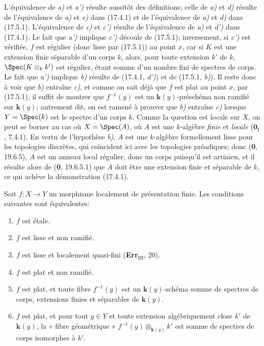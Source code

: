 L'équivalence de \emph{a)} et \emph{a')} résulte aussitôt des définitions; celle de \emph{a)} et \emph{d)} résulte de l'équivalence de \emph{a)} et \emph{e)} dans (17.4.1) et de l'équivalence de \emph{a)} et \emph{d)} dans (17.5.1). L'équivalence de \emph{c)} et \emph{c')} résulte de l'équivalence de \emph{a)} et \emph{d')} dans (17.4.1). Le fait que \emph{a')} implique \emph{c')} découle de (17.5.1); inversement, si \emph{c')} est vérifiée, $f$ est régulier (donc lisse par (17.5.1)) au point $x$, car si $K$ est une extension finie séparable d'un corps $k$, alors, pour toute extension $k'$ de $k$, $\Spec(K\otimes_k k')$ est régulier, étant somme d'un nombre fini de spectres de corps. Le fait que \emph{a')} implique \emph{b)} résulte de (17.4.1, \emph{d')}) et de (17.5.1, \emph{b)}). Il reste donc à voir que \emph{b)} entraîne \emph{c)}, et comme on sait déjà que $f$ est plat au point $x$, par (17.5.1), il suffit de montrer que $f^{-1}(y)$ est un $\boldsymbol{k}(y)$-préschéma non ramifié sur $\boldsymbol{k}(y)$; autrement dit, on est ramené à prouver que \emph{b)} entraîne \emph{c)} lorsque $Y=\Spec(k)$ est le spectre d'un corps $k$. Comme la question est locale sur $X$, on peut se borner au cas où $X=\Spec(A)$, où $A$ est une $k$-algèbre \emph{finie} et \emph{locale} ($\mathbf{0}_{\mathrm I}$, 7.4.1). En vertu de l'hypothèse \emph{b)}, $A$ est une $k$-algèbre formellement lisse pour les topologies discrètes, qui coïncident ici avec les topologies préadiques; donc (\textbf{0}, 19.6.5), $A$ est un anneau local régulier, donc
un corps puisqu'il est artinien, et il résulte alors de (\textbf{0}, 19.6.5.1) que $A$ doit être une extension finie et séparable de $k$, ce qui achève la démonstration (17.4.1).

\begin{corollary}[17.6.2]
\label{IV.17.6.2}
Soit $f:X\to Y$ un morphisme localement de présentation finie. Les conditions suivantes sont équivalentes:
\begin{enumerate}
  \item[\textup{a)}] $f$ est étale.
  \item[\textup{a$'$)}] $f$ est lisse et non ramifié.
  \item[\textup{b)}] $f$ est lisse et localement quasi-fini \textup{(\textbf{Err}$_{\mathrm{III}}$, 20)}.
  \item[\textup{c)}] $f$ est plat et non ramifié.
  \item[\textup{c$'$)}] $f$ est plat, et toute fibre $f^{-1}(y)$ est un $\boldsymbol{k}(y)$-schéma somme de spectres de corps, extensions finies et séparables de $\boldsymbol{k}(y)$.
  \item[\textup{c$''$)}] $f$ est plat, et pour tout $y\in Y$ et toute extension algébriquement close $k'$ de $\boldsymbol{k}(y)$, la « fibre géométrique » $f^{-1}(y)\otimes_{\mathbf{k}(y)}k'$ est somme de spectres de corps isomorphes à $k'$.
\end{enumerate}
\end{corollary}


